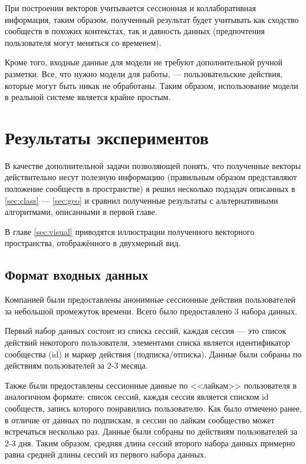 \documentclass[times,specification,annotation]{itmo-student-thesis}
\begin{document}
При построении векторов учитывается сессионная и
коллаборативная информация, таким образом, полученный результат будет
учитывать как сходство сообществ в похожих контекстах, так и давность данных
(предпочтения пользователя могут меняться со временем). 

Кроме того, входные данные для модели не требуют дополнительной ручной разметки. Все, что нужно модели для работы, --- пользовательские действия, которые могут быть никак не обработаны. Таким образом, использование модели в реальной системе является крайне простым.

\chapter{Результаты экспериментов}

В качестве дополнительной задачи позволяющей понять, что полученные
векторы действительно несут полезную информацию (правильным образом
представляют положение сообществ в пространстве) я решил несколько подзадач
описанных в \ref{sec:class} --- \ref{sec:geo} и сравнил полученные результаты с альтернативными
алгоритмами, описанными в первой главе. 

В главе \ref{sec:visual} приводятся иллюстрации полученного векторного пространства, отображённого в двухмерный вид.

\section{Формат входных данных}\label{sec:data-format}

Компанией были предоставлены анонимные сессионные действия пользователей за небольшой промежуток времени. Всего было предоставлено 3 набора данных.

Первый набор данных состоит из списка сессий, каждая сессия --- это список действий некоторого пользователя, элементами списка является идентификатор сообщества (id) и маркер действия (подписка/отписка). Данные были собраны по действиям пользователей за 2-3 месяца.

Также были предоставлены сессионные данные по <<лайкам>> пользователя в аналогичном формате: список сессий, каждая сессия является списком id сообществ, запись которого понравились пользователю. Как было отмечено ранее, в отличие от данных по подпискам, в сессии по лайкам сообщество может встречаться несколько раз. Данные были собраны по действиям пользователей за 2-3 дня. Таким образом, средняя длина сессий второго набора данных примерно равна средней длины сессий из первого набора данных. 
\end{document}
